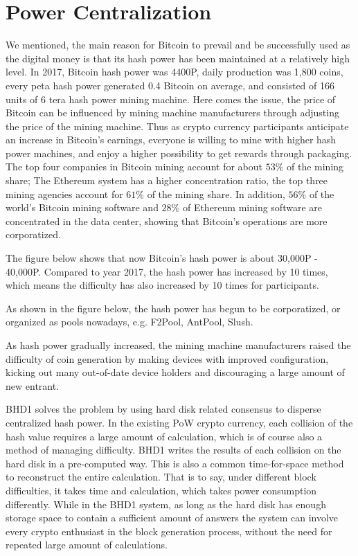 \section{Power Centralization}
\begin{flushleft}
    We mentioned, the main reason for Bitcoin to prevail and be successfully used as the digital money is that its hash power has been maintained at a relatively high level. In 2017, Bitcoin hash power was 4400P, daily production was 1,800 coins, every peta hash power generated 0.4 Bitcoin on average, and consisted of 166 units of 6 tera hash power mining machine. Here comes the issue, the price of Bitcoin can be influenced by mining machine manufacturers through adjusting the price of the mining machine. Thus as crypto currency participants anticipate an increase in Bitcoin's earnings, everyone is willing to mine with higher hash power machines, and enjoy a higher possibility to get rewards through packaging. The top four companies in Bitcoin mining account for about $53\%$ of the mining share; The Ethereum system has a higher concentration ratio, the top three mining agencies account for $61\%$ of the mining share. In addition, $56\%$ of the world's Bitcoin mining software and $28\%$ of Ethereum mining software are concentrated in the data center, showing that Bitcoin's operations are more corporatized.
\end{flushleft}
\begin{flushleft}
    The figure below shows that now Bitcoin's hash power is about 30,000P - 40,000P. Compared to year 2017, the hash power has increased by 10 times, which means the difficulty has also increased by 10 times for participants.
\end{flushleft}
\begin{flushleft}
    As shown in the figure below, the hash power has begun to be corporatized, or organized as pools nowadays, e.g. F2Pool, AntPool, Slush.
\end{flushleft}

\begin{flushleft}
    As hash power gradually increased, the mining machine manufacturers raised the difficulty of coin generation by making devices with improved configuration, kicking out many out-of-date device holders and discouraging a large amount of new entrant.
\end{flushleft}
\begin{flushleft}
    BHD1 solves the problem by using hard disk related consensus to disperse centralized hash power. In the existing PoW crypto currency, each collision of the hash value requires a large amount of calculation, which is of course also a method of managing difficulty. BHD1 writes the results of each collision on the hard disk in a pre-computed way. This is also a common time-for-space method to reconstruct the entire calculation. That is to say, under different block difficulties, it takes time and calculation, which takes power consumption differently. While in the BHD1 system, as long as the hard disk has enough storage space to contain a sufficient amount of answers the system can involve every crypto enthusiast in the block generation process, without the need for repeated large amount of calculations.
\end{flushleft}
